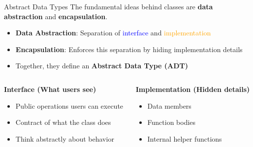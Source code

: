 \begin{frame}[fragile]{Abstract Data Types}
    The fundamental ideas behind classes are \textbf{data abstraction} and \textbf{encapsulation}.

    \begin{itemize}
        \item \textbf{Data Abstraction}: Separation of \textcolor{blue}{interface} and \textcolor{orange}{implementation}
        \item \textbf{Encapsulation}: Enforces this separation by hiding implementation details
        \item Together, they define an \textbf{Abstract Data Type (ADT)}
    \end{itemize}

    \vspace{0.3em}
    \begin{columns}
        \begin{column}{0.5\textwidth}
            \textbf{Interface (What users see)}
            \begin{itemize}
                \item Public operations users can execute
                \item Contract of what the class does
                \item Think abstractly about behavior
            \end{itemize}
        \end{column}
        \begin{column}{0.5\textwidth}
            \textbf{Implementation (Hidden details)}
            \begin{itemize}
                \item Data members
                \item Function bodies
                \item Internal helper functions
            \end{itemize}
        \end{column}
    \end{columns}
\end{frame}


